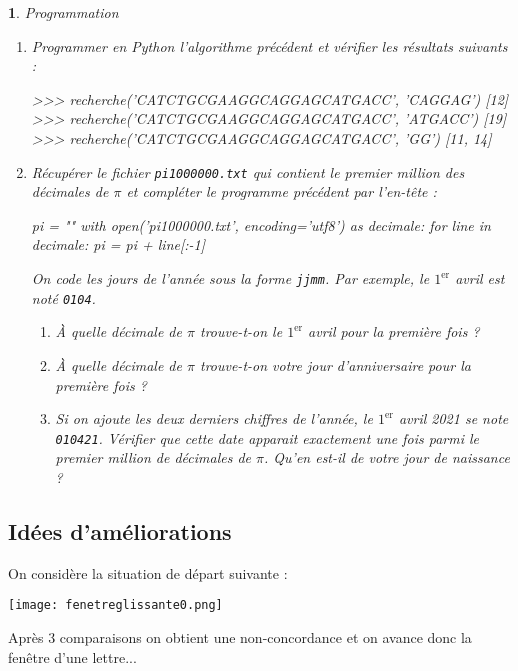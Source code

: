 \documentclass[a4paper,10pt]{report}  %
\theoremstyle{exo}
\newtheorem{exo}{}
\begin{document}
\begin{exo} Programmation


\begin{enumerate}
    \item Programmer en Python l'algorithme précédent et vérifier les résultats suivants :
\begin{console}            
>>> recherche('CATCTGCGAAGGCAGGAGCATGACC', 'CAGGAG')
[12]                              
>>> recherche('CATCTGCGAAGGCAGGAGCATGACC', 'ATGACC')
[19]                          
>>> recherche('CATCTGCGAAGGCAGGAGCATGACC', 'GG')
[11, 14]
\end{console}
    \item Récupérer le fichier \texttt{pi1000000.txt} qui contient le premier million des décimales de $\pi$ et compléter le programme précédent par l'en-tête :
    
\begin{python}
pi = ""
with open('pi1000000.txt', encoding='utf8') as decimale:
    for line in decimale:
        pi = pi + line[:-1]
\end{python}

On code les jours de l'année sous la forme \texttt{jjmm}. Par exemple, le $1^\text{er}$ avril est noté \texttt{0104}.

\begin{enumerate}
    \item À quelle décimale de $\pi$ trouve-t-on le $1^\text{er}$ avril pour la première fois ?
    \item À quelle décimale de $\pi$ trouve-t-on votre jour d'anniversaire pour la première fois ?
    \item Si on ajoute les deux derniers chiffres de l'année, le $1^\text{er}$ avril 2021 se note \texttt{010421}. Vérifier que cette date apparait exactement une fois parmi le premier million de décimales de $\pi$. Qu'en est-il de votre jour de naissance ?
\end{enumerate} 
\end{enumerate}
\end{exo}

\subsection{Idées d'améliorations}

On considère la situation de départ suivante :

\noindent\texttt{[image: fenetreglissante0.png]}

Après 3 comparaisons on obtient une non-concordance et on avance donc la fenêtre d'une lettre...
\end{document}
